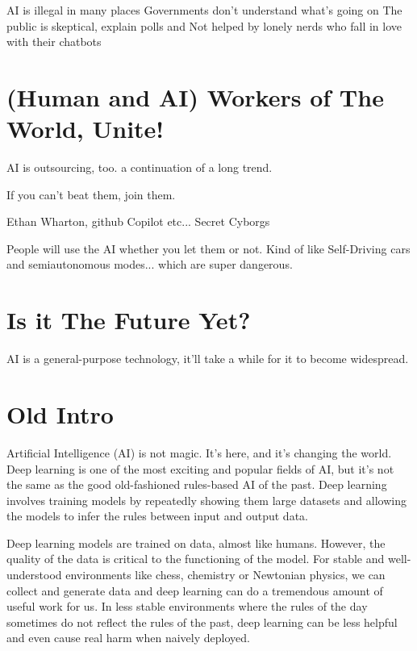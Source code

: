 AI is illegal in many places 
Governments don't understand what's going on 
The public is skeptical, explain polls  and 
Not helped by lonely nerds who fall in love with their chatbots 

\section{(Human and AI) Workers of The World, Unite!}

AI is outsourcing, too. a continuation of a long trend.

If you can't beat them, join them.

Ethan Wharton, github Copilot etc... Secret Cyborgs 

People will use the AI whether you let them or not. Kind of like Self-Driving cars and semiautonomous modes... which are super dangerous.


\section{Is it The Future Yet?}

AI is a general-purpose technology, it'll take a while for it to become widespread.

\section{Old Intro}

Artificial Intelligence (AI) is not magic. It's here, and it's changing the world. Deep learning is one of the most exciting and popular fields of AI, but it's not the same as the good old-fashioned rules-based AI of the past. Deep learning involves training models by repeatedly showing them large datasets and allowing the models to infer the rules between input and output data.

Deep learning models are trained on data, almost like humans. However, the quality of the data is critical to the functioning of the model. For stable and well-understood environments like chess, chemistry or Newtonian physics, we can collect and generate data and deep learning can do a tremendous amount of useful work for us. In less stable environments where the rules of the day sometimes do not reflect the rules of the past, deep learning can be less helpful and even cause real harm when naively deployed. 

